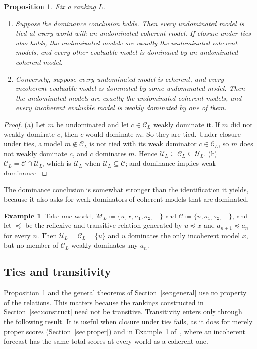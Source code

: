 \documentclass[11pt]{article}
\newtheorem{proposition}[theorem]{Proposition}
\theoremstyle{definition}
\newtheorem{example}[theorem]{Example}
\theoremstyle{remark}
\newcommand{\M}{\mathcal M}
\newcommand{\C}{\mathcal C}
\newcommand{\U}{\mathcal U}
\begin{document}
\begin{proposition}\label{prop:conclusion}
Fix a ranking $L$.
\begin{enumerate}[label=(\alph*)]
\item Suppose the dominance conclusion holds. Then every undominated model is tied at every world with an undominated coherent model. If closure under ties also holds, the undominated models are exactly the undominated coherent models, and every other evaluable model is dominated by an undominated coherent model.
\item Conversely, suppose every undominated model is coherent, and every incoherent evaluable model is dominated by some undominated model. Then the undominated models are exactly the undominated coherent models, and every incoherent evaluable model is weakly dominated by one of them.
\end{enumerate}
\end{proposition}
\begin{proof}
(a) Let $m$ be undominated and let $c\in\C_L$ weakly dominate it. If $m$ did not weakly dominate $c$, then $c$ would dominate $m$. So they are tied. Under closure under ties, a model $m\notin\C_L$ is not tied with its weak dominator $c\in\C_L$, so $m$ does not weakly dominate $c$, and $c$ dominates $m$. Hence $\U_L\subseteq\C_L\subseteq\U_L$.
(b) $\C_L=\C\cap\U_L$, which is $\U_L$ when $\U_L\subseteq\C$; and dominance implies weak dominance.
\end{proof}

The dominance conclusion is somewhat stronger than the identification it yields, because it also asks for weak dominators of coherent models that are dominated.
\begin{example}\label{ex:conclusion-stronger}
Take one world, $\M_L\coloneqq\{u,x,a_1,a_2,\dots\}$ and $\C\coloneqq\{u,a_1,a_2,\dots\}$, and let $\preceq$ be the reflexive and transitive relation generated by $u\preceq x$ and $a_{n+1}\preceq a_n$ for every $n$. Then $\U_L=\C_L=\{u\}$ and $u$ dominates the only incoherent model $x$, but no member of $\C_L$ weakly dominates any $a_n$.
\end{example}

\subsection{Ties and transitivity}
Proposition~\ref{prop:conclusion} and the general theorems of Section~\ref{sec:general} use no property of the relations. This matters because the rankings constructed in Section~\ref{sec:construct} need not be transitive. Transitivity enters only through the following result. It is useful when closure under ties fails, as it does for merely proper scores (Section~\ref{sec:proper}) and in Example~1 of~\cite{SSK09}, where an incoherent forecast has the same total scores at every world as a coherent one.
\end{document}
